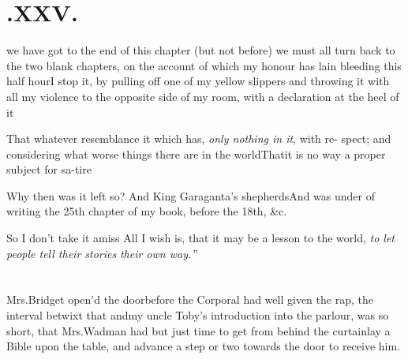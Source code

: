\documentclass[twoside]{article}
\begin{document}
\section{\chapstrut{}.\enspace XXV.}

 we have got to the end of this
chapter (but not before) we must all turn back to the two blank
chapters, on the account of which my honour has lain bleeding this
half hour\break\tsh I stop it, by pulling off one of my yellow
slippers and throwing it with all my violence to the opposite side
of my room, with a declaration at the heel of it\tsh

\tsh That whatever resemblance it 
\etp{} 
which has, \textit{only nothing in it}, with re-\break
spect; and considering what worse things there
are in the world\tsk\!\tsk That\break it is no way a proper subject for
sa-\break tire\tsh

\tsh Why then was it left so? And
King Garagant\sic{}a’s shepherds\tsh And
was under of writing the 25th chapter of my book, before the 18th, \&c.

\tsh So I don’t take it amiss\tsh\break
All I wish is, that it may be a lesson to\break
the world, \lqq \textit{to let people tell their stories}\break
\lqq \textit{their own way}.\,”

\vfill
\rightline{\rlap{\quad\club}}\eject
\null{}\baselineskip
\section{}

 Mrs.\@ Bridget open’d the
door\break before the Corporal had well given the rap, the interval
betwixt that and\break my uncle Toby’s introduction into the
parlour, was so short, that Mrs.\@ Wadman had but just time to
get from behind the curtain\tsh lay a Bible upon the
table, and advance a step or two towards the door to receive
him.
\end{document}
